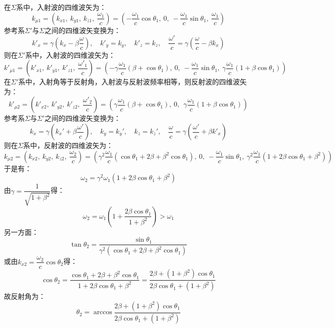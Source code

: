 \documentclass[a4paper,fontset=none]{ctexart}
\begin{document}
\begin{itemize}
    在$\varSigma$系中，入射波的四维波矢为：
    \[
        k_{\mu1} = \left(k_{x1},\ k_{y1},\ k_{z1},\ \frac{\omega_1}{c}\right) = \left(-\frac{\omega_1}{c}\cos\theta_1,\ 0,\ -\frac{\omega_1}{c}\sin\theta_1,\ \frac{\omega_1}{c}\right)
    \]
    参考系$\varSigma'$与$\varSigma$之间的四维波矢变换为：
    \[
        k'_x = \gamma\left(k_x-\beta\frac{\omega}{c}\right),\quad k'_y = k_y,\quad k'_z = k_z,\quad \frac{\omega'}{c} = \gamma\left(\frac{\omega}{c}-\beta k_x\right)
    \]
    则在$\varSigma'$系中，入射波的四维波矢为：
    \[
        k'_{\mu1} = \left(k'_{x1},\ k'_{y1},\ k'_{z1},\ \frac{\omega'_1}{c}\right) = \left(-\gamma\frac{\omega_1}{c}(\beta+\cos\theta_1),\ 0,\ -\frac{\omega_1}{c}\sin\theta_1,\ \gamma\frac{\omega_1}{c}(1+\beta\cos\theta_1)\right)
    \]
    在$\varSigma'$系中，入射角等于反射角，入射波与反射波频率相等，则反射波的四维波矢为：
    \[
        k'_{\mu2} = \left(k'_{x2},\ k'_{y2},\ k'_{z2},\ \frac{\omega'_2}{c}\right) = \left(\gamma\frac{\omega_1}{c}(\beta+\cos\theta_1),\ 0,\ \ \gamma\frac{\omega_1}{c}(1+\beta\cos\theta_1)\right)
    \]
    参考系$\varSigma$与$\varSigma'$之间的四维波矢变换为：
    \[
        k_x = \gamma\left(k_x'+\beta\frac{\omega'}{c}\right),\quad k_y = k_y',\quad k_z = k_z',\quad \frac{\omega}{c} = \gamma\left(\frac{\omega'}{c}+\beta k'_x\right)
    \]
    则在$\varSigma$系中，反射波的四维波矢为：
    \[
        k_{\mu2} = \left(k_{x2},\ k_{y2},\ k_{z2},\ \frac{\omega_2}{c}\right) = \left(\gamma^2\frac{\omega_1}{c}(\cos\theta_1+2\beta+\beta^2\cos\theta_1),\ 0,\ -\frac{\omega_1}{c}\sin\theta_1,\ \gamma^2\frac{\omega_1}{c}(1+2\beta\cos\theta_1+\beta^2)\right)
    \]
    于是有：
    \[
        \omega_2 = \gamma^2\omega_1(1 + 2\beta\cos\theta_1 + \beta^2)
    \]
    由$\gamma=\dfrac{1}{\sqrt{1+\beta^2}}$得：
    \[
        \omega_2 = \omega_1\left(1 + \frac{2\beta\cos\theta_1}{1+\beta^2}\right) > \omega_1
    \]
    另一方面：
    \[
        \tan\theta_2 = \frac{\sin\theta_1}{\gamma^2(\cos\theta_1 + 2\beta + \beta^2\cos\theta_1)}
    \]
    或由$k_{x2}=\dfrac{\omega_2}{c}\cos\theta_2$得：
    \[
        \cos\theta_2 = \frac{\cos\theta_1 + 2\beta + \beta^2\cos\theta_1}{1 + 2\beta\cos\theta_1 + \beta^2} = \frac{2\beta + (1+\beta^2)\cos\theta_1}{2\beta\cos\theta_1 + (1+\beta^2)}
    \]
    故反射角为：
    \[
        \theta_2 = \arccos\frac{2\beta + (1+\beta^2)\cos\theta_1}{2\beta\cos\theta_1 + (1+\beta^2)}
    \]

\end{itemize}
\end{document}
